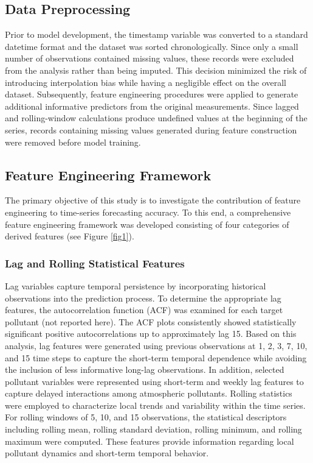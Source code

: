 \documentclass[twoside]{article}
\begin{document}
\subsection{Data Preprocessing}
Prior to model development, the timestamp variable was converted to a standard datetime format and the dataset was sorted chronologically. Since only a small number of observations contained missing values, these records were excluded from the analysis rather than being imputed. This decision minimized the risk of introducing interpolation bias while having a negligible effect on the overall dataset. Subsequently, feature engineering procedures were applied to generate additional informative predictors from the original measurements. Since lagged and rolling-window calculations produce undefined values at the beginning of the series, records containing missing values generated during feature construction were removed before model training.
\subsection{Feature Engineering Framework}
The primary objective of this study is to investigate the contribution of feature engineering to time-series forecasting accuracy. To this end, a comprehensive feature engineering framework was developed consisting of four categories of derived features (see Figure \ref{fig1}).
\subsubsection{Lag and Rolling Statistical Features} 
Lag variables capture temporal persistence by incorporating historical observations into the prediction process. To determine the appropriate lag features, the autocorrelation function (ACF) was examined for each target pollutant (not reported here). The ACF plots consistently showed statistically significant positive autocorrelations up to approximately lag 15. Based on this analysis, lag features  were generated using previous observations at 1, 2, 3, 7, 10, and 15 time steps to capture the short-term temporal dependence while avoiding the inclusion of less informative long-lag observations. In addition, selected pollutant variables were represented using short-term and weekly lag features to capture delayed interactions among atmospheric pollutants. Rolling statistics were employed to characterize local trends and variability within the time series. For rolling windows of 5, 10, and 15 observations, the statistical descriptors including rolling mean, rolling standard deviation, rolling minimum, and rolling maximum were computed. 
These features provide information regarding local pollutant dynamics and short-term temporal behavior.
\end{document}
